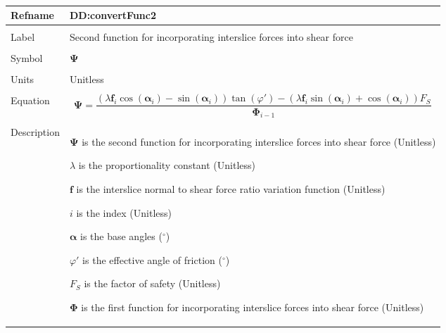 \documentclass[12pt]{article}
\begin{document}
\par~

\noindent \begin{minipage}{\textwidth}
          \begin{tabular}{>{\raggedright}p{}>{\raggedright\arraybackslash}p{}}
          \toprule \textbf{Refname} & \textbf{DD:convertFunc2}
          \label{DD:convertFunc2}
          \\ \midrule \\
          Label & Second function for incorporating interslice forces into shear force
          \\ \midrule \\
          Symbol & $\mathbf{Ψ}$
          \\ \midrule \\
          Units & Unitless
          \\ \midrule \\
          Equation & \begin{displaymath}
                     \mathbf{Ψ}=\frac{\left(λ {\mathbf{f}}_{i} \cos\left({\mathbf{α}}_{i}\right)-\sin\left({\mathbf{α}}_{i}\right)\right) \tan\left(φ'\right)-\left(λ {\mathbf{f}}_{i} \sin\left({\mathbf{α}}_{i}\right)+\cos\left({\mathbf{α}}_{i}\right)\right) {F_{S}}}{{\mathbf{Φ}}_{i-1}}
                     \end{displaymath}
          \\ \midrule \\
          Description & \begin{symbDescription}
                        \item{$\mathbf{Ψ}$ is the second function for incorporating interslice forces into shear force (Unitless)}
                        \item{$λ$ is the proportionality constant (Unitless)}
                        \item{$\mathbf{f}$ is the interslice normal to shear force ratio variation function (Unitless)}
                        \item{$i$ is the index (Unitless)}
                        \item{$\mathbf{α}$ is the base angles (${}^{\circ}$)}
                        \item{$φ'$ is the effective angle of friction (${}^{\circ}$)}
                        \item{${F_{S}}$ is the factor of safety (Unitless)}
                        \item{$\mathbf{Φ}$ is the first function for incorporating interslice forces into shear force (Unitless)}

\end{symbDescription}
\end{tabular}
\end{minipage}
\end{document}
